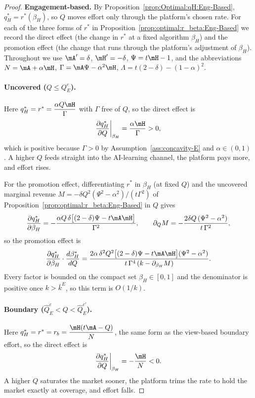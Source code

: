 \begin{proof}
\medskip
\textbf{Engagement-based.}
By Proposition~\ref{prop:Optimal:qH:Eng-Based}, $q_H^*=r^*(\beta_H)$, so $Q$ moves
effort only through the platform's chosen rate. For each of the three forms of
$r^*$ in Proposition~\ref{prop:optimal:r_beta:Eng-Based} we record the direct
effect (the change in $r^*$ at a fixed algorithm $\beta_H$) and the promotion
effect (the change that runs through the platform's adjustment of $\beta_H$).
Throughout we use $\mA'=\delta$, $\mH'=-\delta$, $\Psi=t\mH-1$, and the abbreviations
$N=\mA+\alpha\mH$, $\Gamma=\mA\Psi-\alpha^{2}\mH$, $\Lambda=t(2-\delta)-(1-\alpha)^{2}$.
 
\medskip
\paragraph{Uncovered ($Q\le Q_{E}^c$).}
Here $q_H^*=r^*=\dfrac{\alpha Q\mH}{\Gamma}$ with $\Gamma$ free of $Q$, so the direct effect is
\[
    \frac{\partial q_H^*}{\partial Q}\bigg|_{\beta_H}=\frac{\alpha\mH}{\Gamma}>0,
\]
which is positive because $\Gamma>0$ by Assumption~\ref{ass:concavity-E} and
$\alpha\in(0,1)$. A higher $Q$ feeds straight into the AI-learning channel, the
platform pays more, and effort rises.
 
For the promotion effect, differentiating $r^*$ in $\beta_H$ (at fixed $Q$) and
the uncovered marginal revenue $M=-\delta Q^{2}(\Psi^{2}-\alpha^{2})/(t\Gamma^{2})$
of Proposition~\ref{prop:optimal:r_beta:Eng-Based} in $Q$ gives
\[
    \frac{\partial q_H^*}{\partial\beta_H}
    =-\frac{\alpha Q\,\delta\bigl[(2-\delta)\Psi-t\mA\mH\bigr]}{\Gamma^{2}},
    \qquad
    \partial_Q M=-\frac{2\delta Q\,(\Psi^{2}-\alpha^{2})}{t\,\Gamma^{2}},
\]
so the promotion effect is
\[
    \frac{\partial q_H^*}{\partial\beta_H}\cdot\frac{d\beta_H^*}{dQ}
    =\frac{2\alpha\,\delta^{2}Q^{2}\bigl[(2-\delta)\Psi-t\mA\mH\bigr](\Psi^{2}-\alpha^{2})}
          {t\,\Gamma^{4}\,(k-\partial_{\beta_H}M)}.
\]
Every factor is bounded on the compact set $\beta_H\in[0,1]$ and the denominator
is positive once $k>\bar k^{E}$, so this term is $O(1/k)$.
 
\medskip
\paragraph{Boundary ($\hat Q_{E}^c<Q<\hat Q_E^{c'}$).}
Here $q_H^*=r^*=r_b=\dfrac{\mH(t\mA-Q)}{N}$, the same form as the view-based
boundary effort, so the direct effect is
\[
    \frac{\partial q_H^*}{\partial Q}\bigg|_{\beta_H}=-\frac{\mH}{N}<0.
\]
A higher $Q$ saturates the market sooner, the platform trims the rate to hold the
market exactly at coverage, and effort falls.
 

\end{proof}
